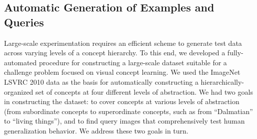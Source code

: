 \subsection{Automatic Generation of Examples and Queries}

Large-scale experimentation requires an efficient scheme to generate test data across varying levels of a concept hierarchy. To this end, we developed a fully-automated procedure for constructing a large-scale dataset suitable for a challenge problem focused on visual concept learning. We used the ImageNet LSVRC \cite{ilsvrc} 2010 data as the basis for automatically constructing a hierarchically-organized set of concepts at four different levels of abstraction. We had two goals in constructing the dataset: to cover concepts at various levels of abstraction (from subordinate concepts to superordinate concepts, such as from “Dalmatian” to “living things”), and to find query images that comprehensively test human generalization behavior. We address these two goals in turn.

